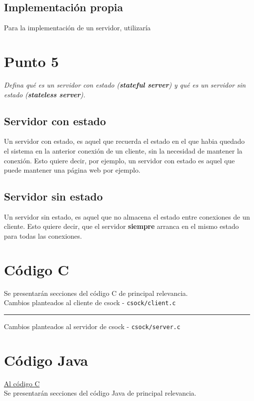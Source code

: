 \documentclass[12pt,journal,compsoc]{IEEEtran}
\begin{document}
\subsection{Implementación propia}
Para la implementación de un servidor, utilizaría 

\section{Punto 5}
\textit{Defina qué es un servidor con estado (\textbf{stateful server}) y qué es un servidor sin estado
(\textbf{stateless server}).}\\

\subsection{Servidor con estado}
Un servidor con estado, es aquel que recuerda el estado en el que habia quedado el sistema
en la anterior conexión de un cliente, sin la necesidad de mantener la conexión.
Esto quiere decir, por ejemplo, un servidor con estado es aquel que puede mantener una 
página web por ejemplo.

\subsection{Servidor sin estado}
Un servidor sin estado, es aquel que no almacena el estado entre conexiones de un cliente.
Esto quiere decir, que el servidor \textbf{siempre} arranca en el mismo estado para todas las
conexiones.

\newpage
\onecolumn

\appendices
\section{Código C}
\label{appendixA}
Se presentarán secciones del código C de principal relevancia.\\
Cambios planteados al cliente de csock - \texttt{csock/client.c}\\



\noindent\rule{\textwidth}{1pt}

\noindent
Cambios planteados al servidor de csock - \texttt{csock/server.c}\\



\section{Código Java}
\hyperref[appendixA]{Al código C}\\
Se presentarán secciones del código Java de principal relevancia.

\end{document}
